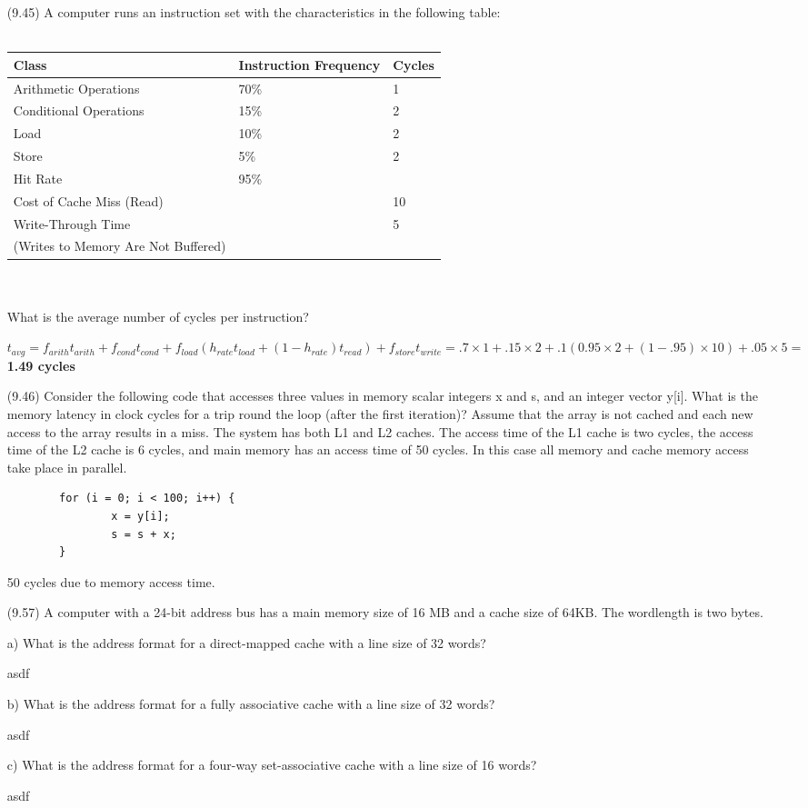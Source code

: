 \documentclass[letterpaper,10pt,titlepage]{article}
\begin{document}
\begin{enumerate}
	\item[(9.45)] A computer runs an instruction set with the characteristics in the
		following table:\\ \\
		\begin{tabular}{ l l l }
			Class & Instruction Frequency & Cycles \\
			\hline
			Arithmetic Operations & 70\% & 1 \\
			Conditional Operations & 15\% & 2 \\
			Load & 10\% & 2 \\
			Store & 5\% & 2 \\
			Hit Rate & 95\% & \\
			Cost of Cache Miss (Read) & & 10 \\
			Write-Through Time & & 5 \\
			(Writes to Memory Are Not Buffered) & & \\ 
		\end{tabular} \\ \\
		What is the average number of cycles per instruction?
	\item[\textbullet] 
		$t_{avg}=f_{arith}t_{arith}+f_{cond}t_{cond}+f_{load}(h_{rate}t_{load}+(1-h_{rate})t_{read})+f_{store}t_{write}=.7\times1+.15\times2+.1(0.95\times2+(1-.95)\times10)+.05\times5=$\textbf{1.49 cycles}

	\item[(9.46)] Consider the following code that accesses three values in memory
		scalar integers x and s, and an integer vector y[i]. What is the memory
		latency in clock cycles for a trip round the loop (after the first
		iteration)? Assume that the array is not cached and each new access to the
		array results in a miss. The system has both L1 and L2 caches. The access
		time of the L1 cache is two cycles, the access time of the L2 cache is 6
		cycles, and main memory has an access time of 50 cycles. In this case all
		memory and cache memory access take place in parallel.
		\begin{verbatim}
		for (i = 0; i < 100; i++) {
		        x = y[i];
		        s = s + x;
		}
		\end{verbatim}
	\item[\textbullet] 50 cycles due to memory access time.

	\item[(9.57)] A computer with a 24-bit address bus has a main memory size of 16 MB
		and a cache size of 64KB. The wordlength is two bytes.
	\item[a)] What is the address format for a direct-mapped cache with a line size of
		32 words?
	\item[\textbullet] asdf
	\item[b)] What is the address format for a fully associative cache with a line
		size of 32 words?
	\item[\textbullet] asdf
	\item[c)] What is the address format for a four-way set-associative cache with a
		line size of 16 words?
	\item[\textbullet] asdf


\end{enumerate}
\end{document}
